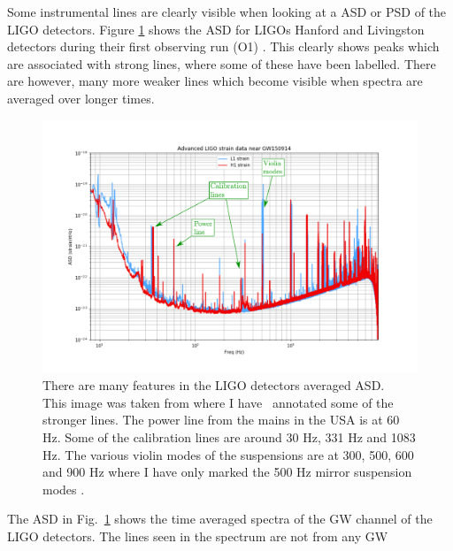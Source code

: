 Some instrumental lines are clearly visible when looking at a \gls{ASD} or
\gls{PSD} of the \gls{LIGO} detectors. Figure \ref{detchar:line:psd} shows the
\gls{ASD} for \glspl{LIGO} Hanford and Livingston detectors during their first
observing run (O1) \citep{GWOpen}. This clearly shows peaks which are
associated with strong lines, where some of these have been labelled. There are however, many
more weaker lines which become visible when spectra are averaged over longer
times.
%
\begin{figure} \centering
\includegraphics[width=\textwidth]{C5_detchar/ligo_o1_asd_annot.pdf}
\caption[Strain \gls{ASD} for the \gls{LIGO} detectors.]{There are many
features in the \gls{LIGO} detectors averaged \gls{ASD}.~ This image was taken
from \citep{GWOpen} where I have~ annotated some of the stronger lines. The
power line from the mains in the USA is at 60 Hz. Some of the calibration lines
are around 30 Hz, 331 Hz and 1083 Hz. The various violin modes of the
suspensions are at 300, 500, 600 and 900 Hz where I have only marked the 500 Hz
mirror suspension modes \citep{GWOpen}.} \label{detchar:line:psd} \end{figure}
%
The \gls{ASD} in Fig.~\ref{detchar:line:psd} shows the time averaged spectra
of the \gls{GW} channel of the \gls{LIGO} detectors. The lines seen in the spectrum are not from any \gls{GW}
